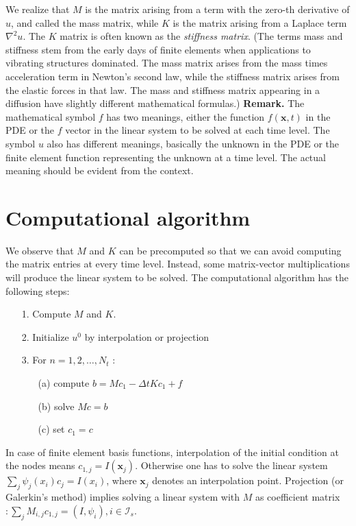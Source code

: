 \documentclass[../main.tex]{subfiles}
\begin{document}
		 We realize that $M$ is the matrix arising from a term with the zero-th derivative of $u$, and called the mass matrix, while $K$ is the matrix arising from a Laplace term $\nabla^{2} u$. The $K$ matrix is often known as the \emph{stiffness matrix}. (The terms mass and stiffness stem from the early days of finite elements when applications to vibrating structures dominated. The mass matrix arises from the mass times acceleration term in Newton's second law, while the stiffness matrix arises from the elastic forces in that law. The mass and stiffness matrix appearing in a diffusion have slightly different mathematical formulas.)\smallbreak
		\noindent \textbf{Remark.   } The mathematical symbol $f$ has two meanings, either the function $f(\boldsymbol{x}, t)$ in the PDE or the $f$ vector in the linear system to be solved at each time level. The symbol $u$ also has different meanings, basically the unknown in the PDE or the finite element function representing the unknown at a time level. The actual meaning should be evident from the context.
		
	\section[Computational algorithm]{Computational algorithm}
		\label{sec:sec_19_5}
		\noindent We observe that $M$ and $K$ can be precomputed so that we can avoid computing the matrix entries at every time level. Instead, some matrix-vector multiplications will produce the linear system to be solved. The computational algorithm has the following steps:

		\begin{enumerate}
		\item [1.] Compute $M$ and $K$.
		\item [2.] Initialize $u^{0}$ by interpolation or projection
		\item [3.] For $n=1,2, \ldots, N_{t}$ :
			\begin{enumerate}
				\item[(a)] compute $b=M c_{1}-\Delta t K c_{1}+f$
				\item[(b)] solve $M c=b$
				\item[(c)] set $c_{1}=c$
			\end{enumerate}
		\end{enumerate}
	
		\noindent In case of finite element basis functions, interpolation of the initial condition at the nodes means $c_{1, j}=I\left(\boldsymbol{x}_{j}\right)$. Otherwise one has to solve the linear system $\sum_{j} \psi_{j}\left(x_{i}\right) c_{j}=I\left(x_{i}\right)$, where $\boldsymbol{x}_{j}$ denotes an interpolation point. Projection (or Galerkin's method) implies solving a linear system with $M$ as coefficient matrix $: \sum_{j} M_{i, j} c_{1, j}=\left(I, \psi_{i}\right), i \in \mathcal{I}_{s}$.
		
\end{document}
